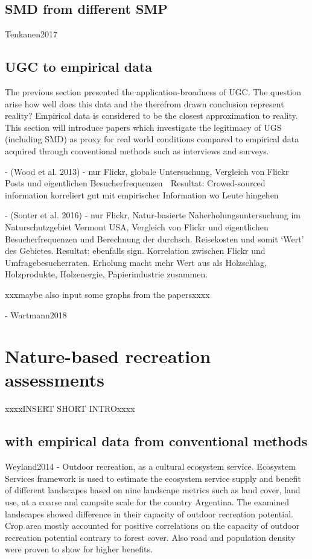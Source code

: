 \subsection{SMD from different SMP}
Tenkanen2017

\subsection{UGC to empirical data}
The previous section presented the application-broadness of UGC. The question arise how well does this data and the therefrom drawn conclusion represent reality? Empirical data is considered to be the closest approximation to reality. This section will introduce papers which investigate the legitimacy of UGS (including SMD) as proxy for real world conditions compared to empirical data acquired through conventional methods such as interviews and surveys.

- (Wood et al. 2013) - nur Flickr, globale Untersuchung, Vergleich von Flickr Posts und eigentlichen Besucherfrequenzen
 Resultat: Crowed-sourced information korreliert gut mit empirischer Information wo Leute hingehen

- (Sonter et al. 2016) - nur Flickr, Natur-basierte Naherholungsuntersuchung im Naturschutzgebiet Vermont USA, Vergleich von Flickr und eigentlichen Besucherfrequenzen und Berechnung der durchsch. Reisekosten und somit ‘Wert’ des Gebietes.
Resultat: ebenfalls sign. Korrelation zwischen Flickr und Umfragebesucherraten. Erholung macht mehr Wert aus als Holzschlag, Holzprodukte, Holzenergie, Papierindustrie zusammen.

xxxmaybe also input some graphs from the papersxxxx

- Wartmann2018

\section{Nature-based recreation assessments}
xxxxINSERT SHORT INTROxxxx
\subsection{with empirical data from conventional methods}
Weyland2014 - Outdoor recreation, as a cultural ecosystem service. Ecosystem Services framework is used to estimate the ecosystem service supply and benefit of different landscapes based on nine landscape metrics such as land cover, land use, at a coarse and campsite scale for the country Argentina. The examined landscapes showed difference in their capacity of outdoor recreation potential. Crop area mostly accounted for positive correlations on the capacity of outdoor recreation potential contrary to forest cover. Also road and population density were proven to show for higher benefits.

